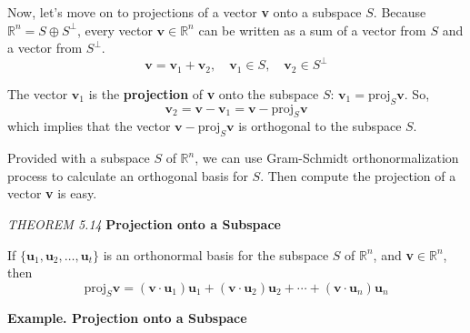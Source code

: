 \documentclass{article}
\newcommand\B{\textbf}
\newcommand\tcl{\begin{tcolorbox}[colback = {blue9}]}
\newcommand\etcl{\end{tcolorbox}}
\newcommand\R{\mathbb{R}}
\newcommand\T{\textit}
\begin{document}
    Now, let's move on to projections of a vector \B{v} onto a subspace $S$. Because $\R^n = S \oplus S^\perp$,
    every vector $\B{v} \in \R^n$ can be written as a sum of a vector from $S$ and a vector from $S^\perp$.
    \[ \B{v} = \B{v}_1 + \B{v}_2, \quad \B{v}_1 \in S, \quad \B{v}_2 \in S^\perp \]

    The vector $\B{v}_1$ is the \B{projection} of \B{v} onto the subspace $S$: $\B{v}_1 = \text{proj}_S\B{v}$. So,
    \[\B{v}_2 = \B{v} - \B{v}_1 = \B{v} - \text{proj}_S\B{v}\]
    which implies that the vector $\B{v} - \text{proj}_S\B{v}$ is orthogonal to the subspace $S$.

    Provided with a subspace $S$ of $\R^n$, we can use Gram-Schmidt orthonormalization process to calculate
    an orthogonal basis for $S$. Then compute the projection of a vector \B{v} is easy.
    \tcl
    \T{THEOREM 5.14} \B{Projection onto a Subspace} 

    If $\{\B{u}_1, \B{u}_2, \dots, \B{u}_t \}$ is an orthonormal basis for the subspace $S$ of $\R^n$, and \B{v}$\in\R^n$, then
    \[ \text{proj}_S\B{v} = (\B{v} \cdot \B{u}_1) \B{u}_1 + (\B{v} \cdot \B{u}_2) \B{u}_2 + \cdots + (\B{v} \cdot \B{u}_n) \B{u}_n \]
    \etcl 
    \B{Example. \textcolor{blue5}{Projection onto a Subspace}}
    
\end{document}
